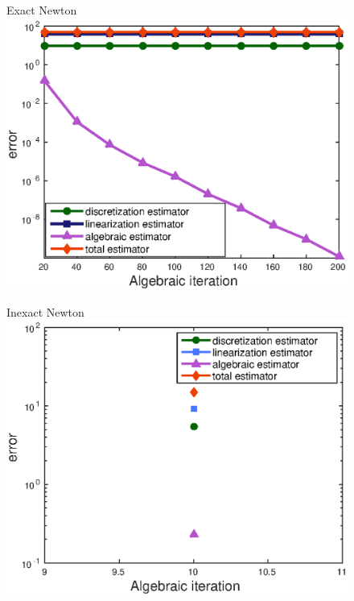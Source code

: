 \documentclass[10 pt]{beamer}
\begin{document}
\begin{frame}
\begin{figure}
\begin{minipage}[c]{.33\linewidth}
   \centering
   Exact Newton
\includegraphics[width=\textwidth]{fig_article/estimators_algebraic_iter_first_newton_step_exact_res_bis.eps}    
\end{minipage}\hfill
\begin{minipage}[c]{.32\linewidth}
   \centering
   Inexact Newton
\includegraphics[width=\textwidth]{fig_article/estimators_algebraic_iter_second_inex_newton_step.eps}    

\end{minipage}
\end{figure}
\end{frame}
\end{document}
